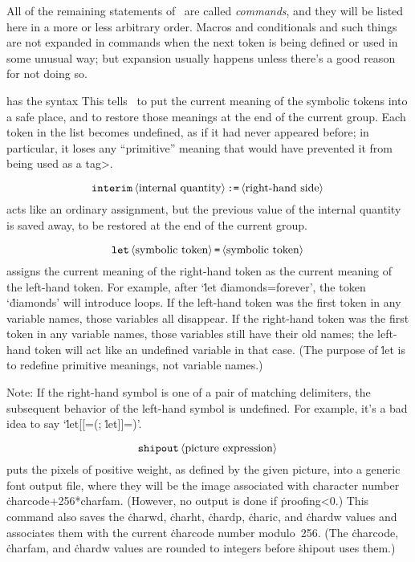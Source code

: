 \medbreak
All of the remaining statements of \MF\ are called {\it commands}, and they
will be listed here in a more or less arbitrary order. Macros and
conditionals and such things are not expanded in commands when the
next token is being defined or used in some unusual way; but expansion
usually happens unless there's a good reason for not doing so.

\def\@{\bigskip\textindent{$\bullet$}}
 has the syntax
This tells \MF\ to put the current meaning of the symbolic tokens into
a safe place, and to restore those meanings at the end of the current
group. Each token in the list becomes undefined, as if it had never appeared
before; in particular, it loses any ``primitive'' meaning that
would have prevented it from being used as a \<tag>.

$$\hbox{\.{interim}\<internal quantity>\.{:=}\<right-hand side>}$$
acts like an ordinary assignment, but the previous value of the internal
quantity is saved away, to be restored at the end of the current group.

$$\hbox{\.{let}\<symbolic token>\.=\<symbolic token>}$$
assigns the current meaning of the right-hand token as the current
meaning of the left-hand token. For example, after
`\.{let} \.{diamonds=forever}', the token `\.{diamonds}' will introduce
loops. If the left-hand token was the
first token in any variable names, those variables all disappear.
If the right-hand token was the first token in any variable names,
those variables still have their old names; the left-hand token
will act like an undefined variable in that case. (The purpose of
\.{let} is to redefine primitive meanings, not variable names.)

Note: If the right-hand symbol is one of a pair of matching delimiters,
the subsequent behavior of the left-hand symbol is undefined. For
example, it's a bad idea to say `\.{let[[=(;} \.{let]]=)}'.

$$\hbox{\.{shipout}\<picture expression>}$$
puts the pixels of positive weight, as defined by the given picture,
into a generic font output file, where they will be the image associated
with character number \.{charcode+256*charfam}. (However, no output is done
if \.{proofing<0}.) This command also saves the \.{charwd}, \.{charht},
\.{chardp}, \.{charic}, and \.{chardw} values and associates them with
the current \.{charcode} number modulo~256. (The \.{charcode}, \.{charfam},
and \.{chardw} values are rounded to integers before \.{shipout} uses them.)


